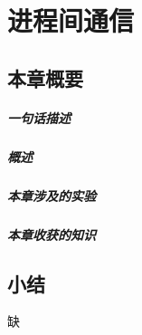 \chapter{进程间通信}\label{ch_ipc}

\section{本章概要}

\paragraph{一句话描述}

\paragraph{概述}

\paragraph{本章涉及的实验}

\paragraph{本章收获的知识}

%
%
%
%
%
%
%


\section{小结}
缺